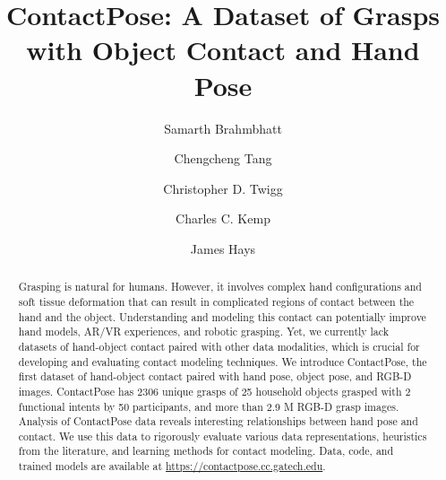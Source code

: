 \documentclass[runningheads]{llncs}
\begin{document}
\pagestyle{headings}
\mainmatter
\def\ECCVSubNumber{1889}  

\newcommand{\etal}{\textit{et al}.}
\newcommand{\ie}{\textit{i}.\textit{e}. }
\newcommand{\eg}{\textit{e}.\textit{g}. }

\title{ContactPose: A Dataset of Grasps with Object Contact and Hand Pose}

\begin{comment}
\titlerunning{ECCV-20 submission ID \ECCVSubNumber} 
\authorrunning{ECCV-20 submission ID \ECCVSubNumber} 
\author{Anonymous ECCV submission}
\institute{Paper ID \ECCVSubNumber}
\end{comment}


\author{Samarth Brahmbhatt \and
Chengcheng Tang \and
Christopher D. Twigg \and
Charles C. Kemp \and
James Hays}
\maketitle

\begin{abstract}
Grasping is natural for humans. However, it involves complex hand configurations and soft tissue deformation that can result in complicated regions of contact between the hand and the object. Understanding and modeling this contact can potentially improve hand models, AR/VR experiences, and robotic grasping. Yet, we currently lack datasets of hand-object contact paired with other data modalities, which is crucial for developing and evaluating contact modeling techniques. We introduce ContactPose, the first dataset of hand-object contact paired with hand pose, object pose, and RGB-D images. ContactPose has 2306 unique grasps of 25 household objects grasped with 2 functional intents by 50 participants, and more than 2.9 M RGB-D grasp images. Analysis of ContactPose data reveals interesting relationships between hand pose and contact. We use this data to rigorously evaluate various data representations, heuristics from the literature, and learning methods for contact modeling. Data, code, and trained models are available at \url{https://contactpose.cc.gatech.edu}.
\end{abstract}
\end{document}
